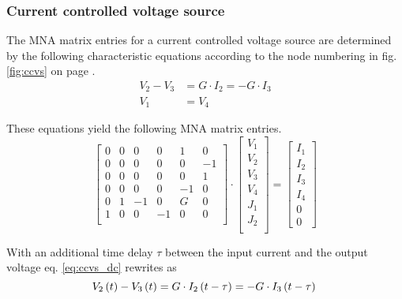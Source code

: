 \subsubsection{Current controlled voltage source}

The MNA matrix entries for a current controlled voltage source are
determined by the following characteristic equations according to the
node numbering in fig. \ref{fig:ccvs} on page \pageref{fig:ccvs}.
\begin{align}
\label{eq:ccvs_dc}
V_2 - V_3 &= G\cdot I_2 = -G\cdot I_3\\
V_1 &= V_4
\end{align}

These equations yield the following MNA matrix entries.
\begin{equation}
\begin{bmatrix}
0 & 0 & 0 & 0 & 1 & 0\\
0 & 0 & 0 & 0 & 0 & -1\\
0 & 0 & 0 & 0 & 0 & 1\\
0 & 0 & 0 & 0 & -1 & 0\\
0 & 1 & -1 & 0 & G & 0\\
1 & 0 & 0 & -1 & 0 & 0\\
\end{bmatrix}
\cdot
\begin{bmatrix}
V_1\\
V_2\\
V_3\\
V_4\\
J_1\\
J_2\\
\end{bmatrix}
=
\begin{bmatrix}
I_1\\
I_2\\
I_3\\
I_4\\
0\\
0
\end{bmatrix}
\end{equation}

With an additional time delay $\tau$ between the input current and
the output voltage eq. \eqref{eq:ccvs_dc} rewrites as
\begin{equation}
\label{eq:ccvs_delay}
V_2\left(t\right) - V_3\left(t\right) = G\cdot I_2\left(t - \tau\right) = -G\cdot I_3\left(t - \tau\right)\\
\end{equation}

